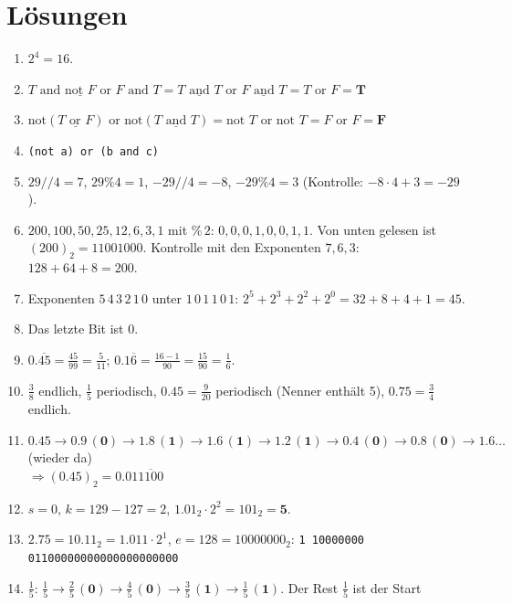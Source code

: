 \section{Lösungen}
\label{sec:01-loesungen}
\begin{enumerate}[label=\textbf{F\arabic*}]
  \item $2^4 = 16$.
  \item $T \text{ and } \underline{\text{not } F} \text{ or } F \text{ and } T
        = \underline{T \text{ and } T} \text{ or } \underline{F \text{ and } T}
        = T \text{ or } F = \mathbf{T}$
  \item $\text{not}(\underline{T \text{ or } F}) \text{ or not}(\underline{T \text{ and } T})
        = \text{not } T \text{ or not } T = F \text{ or } F = \mathbf{F}$
  \item \texttt{(not a) or (b and c)}
  \item $29 /\!/ 4 = 7$, \; $29 \% 4 = 1$, \; $-29 /\!/ 4 = -8$, \; $-29 \% 4 = 3$
        (Kontrolle: $-8 \cdot 4 + 3 = -29$).
  \item $200, 100, 50, 25, 12, 6, 3, 1$ mit $\%\,2$: $0,0,0,1,0,0,1,1$. Von unten gelesen
        ist $(200)_2 = 11001000$.
        Kontrolle mit den Exponenten $7, 6, 3$: $128 + 64 + 8 = 200$.
  \item Exponenten $5\,4\,3\,2\,1\,0$ unter $1\,0\,1\,1\,0\,1$: $2^5 + 2^3 + 2^2 + 2^0
        = 32 + 8 + 4 + 1 = 45$.
  \item Das letzte Bit ist 0.
  \item $0.\overline{45} = \frac{45}{99} = \frac{5}{11}$; \;
        $0.1\overline{6} = \frac{16 - 1}{90} = \frac{15}{90} = \frac16$.
  \item $\frac38$ endlich, $\frac15$ periodisch, $0.45 = \frac{9}{20}$ periodisch
        (Nenner enthält 5), $0.75 = \frac34$ endlich.
  \item $0.45 \to 0.9\,(\mathbf0) \to 1.8\,(\mathbf1) \to 1.6\,(\mathbf1) \to 1.2\,(\mathbf1)
        \to 0.4\,(\mathbf0) \to 0.8\,(\mathbf0) \to 1.6 \ldots$ (wieder da) \\
        $\Rightarrow (0.45)_2 = 0.01\overline{1100}$
  \item $s = 0$, $k = 129 - 127 = 2$, $1.01_2 \cdot 2^2 = 101_2 = \mathbf{5}$.
  \item $2.75 = 10.11_2 = 1.011 \cdot 2^1$, $e = 128 = 10000000_2$:
        \texttt{1 10000000 01100000000000000000000}
  \item $\tfrac15$: \; $\tfrac15 \to \tfrac25\,(\mathbf0) \to \tfrac45\,(\mathbf0) \to
        \tfrac35\,(\mathbf1) \to \tfrac15\,(\mathbf1)$. Der Rest $\tfrac15$ ist der Start

\end{enumerate}
